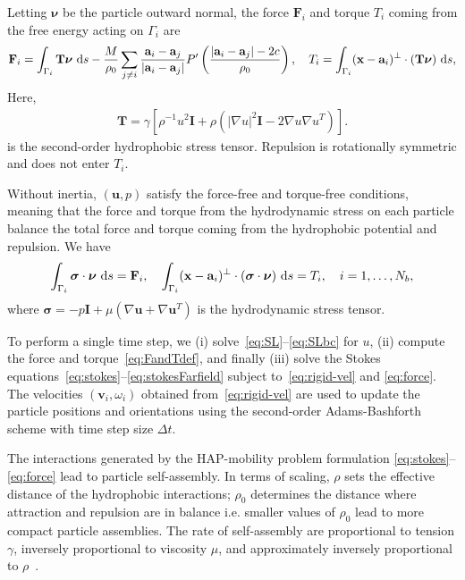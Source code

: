 \documentclass[prb,preprint,showpacs,preprintnumbers,amsmath,amssymb,longbibliography]{revtex4-1}
\renewcommand{\aa}{\mathbf{a}}
\newcommand{\FF}{\mathbf{F}}
\newcommand{\nnu}{\boldsymbol{\nu}}
\newcommand{\ssigma}{\boldsymbol{\sigma}}
\newcommand{\xx}{\mathbf{x}}
\newcommand{\uu}{\mathbf{u}}
\renewcommand{\vv}{\mathbf{v}}
\begin{document}
Letting $\nnu$ be the particle outward normal,
the force $\FF_i$ and torque $T_i$ coming from the free energy
acting on $\Gamma_i$ are~\cite{Fu20}
\begin{align}
  \label{eq:FandTdef}
  \FF_i = \int_{\Gamma_i} \mathbf{T}\nnu \, \dif s
  - \frac{M}{\rho_0}
  \sum_{j \neq i}
  \frac{\aa_i - \aa_j}{|\aa_i - \aa_j|}
P'\left(\frac{|\aa_i - \aa_j|-2c}{\rho_0}\right)
  ,\quad
T_i = \int_{\Gamma_i} (\xx - \aa_i)^{\perp}\cdot (\mathbf{T}\nnu) \, \dif s, 
\end{align}
Here,
\begin{align}
\mathbf{T} = \gamma \left[ \rho^{-1} u^2 \mathbf{I}
  + \rho \left(|\nabla u|^2 \mathbf{I} - 2\nabla u \nabla u^T\right)\right].
\end{align}
is the second-order hydrophobic stress tensor.
Repulsion is rotationally symmetric and
does not enter $T_i$.

Without inertia, $(\uu, p)$ satisfy the force-free and torque-free
conditions, meaning that the force and torque from the hydrodynamic
stress on each particle balance the total force and torque coming from
the hydrophobic potential and repulsion. We have
\begin{equation}
  \label{eq:force}
 \int_{\Gamma_i} \ssigma \cdot \nnu \, \dif s = \FF_i, \quad
 \int_{\Gamma_i} (\xx - \aa_i)^\perp \cdot 
  (\ssigma \cdot \nnu) \, \dif s = T_i,
  \quad i=1,\ldots,N_b,
\end{equation}
where $\ssigma = -p \mathbf{I} + \mu \left(\nabla \uu + \nabla \uu^T
\right)$ is the hydrodynamic stress tensor.

To perform a single time step, we
(i) solve~\eqref{eq:SL}--\eqref{eq:SLbc} for $u$,
(ii) compute the force and torque~\eqref{eq:FandTdef},
and finally (iii) solve the Stokes equations~\eqref{eq:stokes}--\eqref{eq:stokesFarfield}
subject to~\eqref{eq:rigid-vel} and \eqref{eq:force}. 
The velocities $(\vv_i, \omega_i)$ obtained
from~\eqref{eq:rigid-vel} are used to update the
particle positions and orientations
using the second-order Adams-Bashforth scheme
with time step size $\Delta t.$

The interactions
generated by the HAP-mobility problem formulation
\eqref{eq:stokes}--\eqref{eq:force} lead to particle self-assembly.
In terms of scaling, $\rho$ sets the effective distance of the hydrophobic
interactions; $\rho_0$ determines the distance where attraction and repulsion are in
balance i.e. smaller values of $\rho_0$ lead to more compact particle assemblies.
The rate of self-assembly are proportional to tension $\gamma$,
inversely proportional to viscosity $\mu$, and
approximately inversely proportional to $\rho$~\cite{Fu20}.
\end{document}
